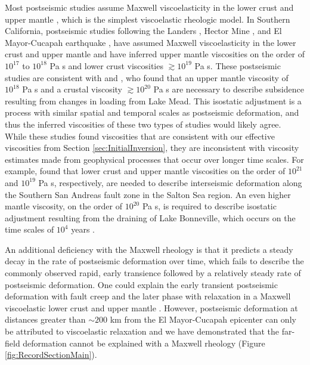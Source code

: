 \documentclass[draft,linenumbers]{AGUJournal}
\begin{document}
Most postseismic studies assume Maxwell viscoelasticity in the lower crust and upper mantle \citep[e.g.][]{Nur1974,Pollitz2000,Hetland2003,Freed2006a,Johnson2009,Hearn2009}, which is the simplest viscoelastic rheologic model.  In Southern California, postseismic studies following the Landers \citep{Pollitz2000}, Hector Mine \citep{Pollitz2001}, and El Mayor-Cucapah earthquake \citep{Spinler2015,Rollins2015}, have assumed Maxwell viscoelasticity in the lower crust and upper mantle and have inferred upper mantle viscosities on the order of $10^{17}$ to $10^{18}$ Pa s and lower crust viscosities $\gtrsim 10^{19}$ Pa s.  These postseismic studies are consistent with \citet{Kaufmann2000} and \citet{Cavalie2007}, who found that an upper mantle viscosity of $10^{18}$ Pa s and a crustal viscosity $\gtrsim10^{20}$ Pa s are necessary to describe subsidence resulting from changes in loading from Lake Mead. This isostatic adjustment is a process with similar spatial and temporal scales as postseismic deformation, and thus the inferred viscosities of these two types of studies would likely agree. While these studies found viscosities that are consistent with our effective viscosities from Section \ref{sec:InitialInversion}, they are inconsistent with viscosity estimates made from geophysical processes that occur over longer time scales. For example, \citet{Lundgren2009} found that lower crust and upper mantle viscosities on the order of $10^{21}$ and $10^{19}$ Pa s, respectively, are needed to describe interseismic deformation along the Southern San Andreas fault zone in the Salton Sea region.  An even higher mantle viscosity, on the order of $10^{20}$ Pa s, is required to describe isostatic adjustment resulting from the draining of Lake Bonneville, which occurs on the time scales of $10^{4}$ years \citep{Crittenden1967,Bills1987}.  

An additional deficiency with the Maxwell rheology is that it predicts a steady decay in the rate of postseismic deformation over time, which fails to describe the commonly observed rapid, early transience followed by a relatively steady rate of postseismic deformation.  One could explain the early transient postseismic deformation with fault creep and the later phase with relaxation in a Maxwell viscoelastic lower crust and upper mantle \citep[e.g][]{Hearn2009,Johnson2009}. However, postseismic deformation at distances greater than ${\sim}200$ km from the El Mayor-Cucapah epicenter can only be attributed to viscoelastic relaxation \citep[e.g.][]{Freed2007a} and we have demonstrated that the far-field deformation cannot be explained with a Maxwell rheology (Figure \ref{fig:RecordSectionMain}).
\end{document}
